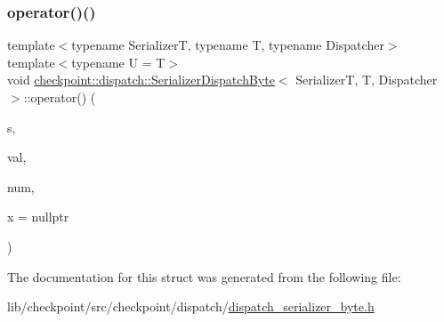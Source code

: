\subsubsection{\texorpdfstring{operator()()}{operator()()}\hspace{0.1cm}{\footnotesize\ttfamily [2/2]}}
{\footnotesize\ttfamily template$<$typename SerializerT, typename T, typename Dispatcher$>$ \\
template$<$typename U  = T$>$ \\
void \hyperlink{structcheckpoint_1_1dispatch_1_1_serializer_dispatch_byte}{checkpoint\+::dispatch\+::\+Serializer\+Dispatch\+Byte}$<$ SerializerT, T, Dispatcher $>$\+::operator() (\begin{DoxyParamCaption}\item[{SerializerT \&}]{s,  }\item[{T $\ast$}]{val,  }\item[{\hyperlink{namespacecheckpoint_a083f6674da3f94c2901b18c6d238217c}{Serial\+Size\+Type}}]{num,  }\item[{\hyperlink{structcheckpoint_1_1dispatch_1_1_serializer_dispatch_byte_af7214bae56db9cc342bc01fc61a8f403}{is\+Not\+Byte\+Copy\+Type}$<$ U $>$ $\ast$}]{x = {\ttfamily nullptr} }\end{DoxyParamCaption})\hspace{0.3cm}{\ttfamily [inline]}}



The documentation for this struct was generated from the following file\+:\begin{DoxyCompactItemize}
\item 
lib/checkpoint/src/checkpoint/dispatch/\hyperlink{dispatch__serializer__byte_8h}{dispatch\+\_\+serializer\+\_\+byte.\+h}\end{DoxyCompactItemize}
